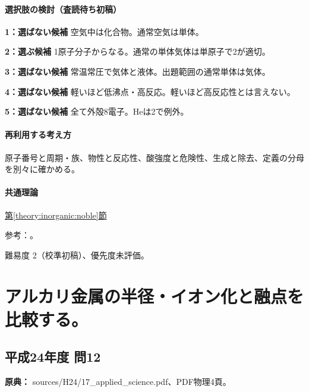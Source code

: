 \paragraph{選択肢の検討（査読待ち初稿）}\mbox{}\par

\noindent\textbf{1：選ばない候補} 空気中は化合物。通常空気は単体。\par

\noindent\textbf{2：選ぶ候補} 1原子分子からなる。通常の単体気体は単原子で2が適切。\par

\noindent\textbf{3：選ばない候補} 常温常圧で気体と液体。出題範囲の通常単体は気体。\par

\noindent\textbf{4：選ばない候補} 軽いほど低沸点・高反応。軽いほど高反応性とは言えない。\par

\noindent\textbf{5：選ばない候補} 全て外殻8電子。Heは2で例外。\par

\paragraph{再利用する考え方} 原子番号と周期・族、物性と反応性、酸強度と危険性、生成と除去、定義の分母を別々に確かめる。

\paragraph{共通理論} \hyperref[theory:inorganic:noble]{第\ref*{theory:inorganic:noble}節}

\par 参考：\cite{inorganic_noble_ref}。

\par 難易度 2（校準初稿）、優先度未評価。

\section{アルカリ金属の半径・イオン化と融点を比較する。}

\subsection{平成24年度 問12}
\label{q:h24-reg-applied-12}

\noindent\textbf{原典：} sources/H24/17\_applied\_science.pdf、PDF物理4頁。

